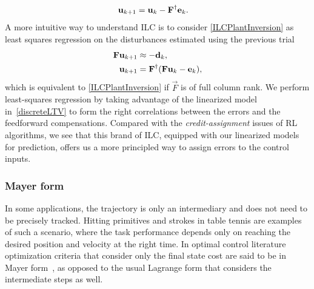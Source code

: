 %
\begin{equation}
\begin{aligned}
\boldsymbol{\mathrm{u}}_{k+1} &= \boldsymbol{\mathrm{u}}_k - \boldsymbol{\mathrm{F}}^{\dagger}\boldsymbol{\mathrm{e}}_k.
\end{aligned}
\label{ILCPlantInversion}
\end{equation}
%
%
\noindent A more intuitive way to understand ILC is to consider \eqref{ILCPlantInversion} as least squares regression on the disturbances estimated using the previous trial
%
\begin{equation}
\begin{aligned}
\boldsymbol{\mathrm{F}}\boldsymbol{\mathrm{u}}_{k+1} &\approx -\boldsymbol{\mathrm{d}}_{k},\\
\boldsymbol{\mathrm{u}}_{k+1} &= \boldsymbol{\mathrm{F}}^{\dagger}(\boldsymbol{\mathrm{F}}\boldsymbol{\mathrm{u}}_{k} - \boldsymbol{\mathrm{e}}_k),
\end{aligned}
\label{ILCasRegression}
\end{equation}
%
\noindent which is equivalent to \eqref{ILCPlantInversion} if $\vec{F}$ is of full column rank. We perform least-squares regression by taking advantage of the linearized model in~\eqref{discreteLTV} to form the right correlations between the errors and the feedforward compensations. Compared with the \emph{credit-assignment} issues of RL algorithms, we see that this brand of ILC, equipped with our linearized models for prediction, offers us a more principled way to assign errors to the control inputs.

\subsubsection{Mayer form}

In some applications, the trajectory is only an intermediary and does not need to be precisely tracked. Hitting primitives and strokes in table tennis are examples of such a scenario, where the task performance depends only on reaching the desired position and velocity at the right time. In optimal control literature optimization criteria that consider only the final state cost are said to be in Mayer form~\cite{Liberzon11}, as opposed to the usual Lagrange form that considers the intermediate steps as well.

